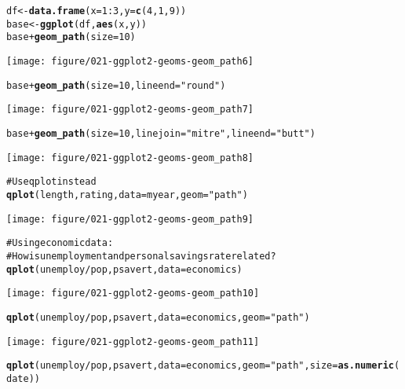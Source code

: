 \documentclass[a4paper,titlepage]{tufte-handout}\usepackage{graphicx, color}
\makeatletter
\def\maxwidth{ %
  \ifdim\Gin@nat@width>\linewidth
    \linewidth
  \else
    \Gin@nat@width
  \fi
}
\newcommand{\hlfunctioncall}[1]{\textcolor[rgb]{0.501960784313725,0,0.329411764705882}{\textbf{#1}}}%
\newcommand{\hlstring}[1]{\textcolor[rgb]{0.6,0.6,1}{#1}}%
\newcommand{\hlcomment}[1]{\textcolor[rgb]{0.180392156862745,0.6,0.341176470588235}{#1}}%
\newenvironment{kframe}{%
 \def\at@end@of@kframe{}%
 \ifinner\ifhmode%
  \def\at@end@of@kframe{\end{minipage}}%
  \begin{minipage}{\columnwidth}%
 \fi\fi%
 \def\FrameCommand##1{\hskip\@totalleftmargin \hskip-\fboxsep
 \colorbox{shadecolor}{##1}\hskip-\fboxsep
     \hskip-\linewidth \hskip-\@totalleftmargin \hskip\columnwidth}%
 \MakeFramed {\advance\hsize-\width
   \@totalleftmargin\z@ \linewidth\hsize
   \@setminipage}}%
 {\par\unskip\endMakeFramed%
 \at@end@of@kframe}
\newenvironment{knitrout}{}{} %
\makeatother
\begin{document}
\begin{knitrout}
\begin{kframe}
\begin{alltt}
df <- \hlfunctioncall{data.frame}(x = 1:3, y = \hlfunctioncall{c}(4, 1, 9))
base <- \hlfunctioncall{ggplot}(df, \hlfunctioncall{aes}(x, y))
base + \hlfunctioncall{geom_path}(size = 10)
\end{alltt}
\end{kframe}\texttt{[image: figure/021-ggplot2-geoms-geom\_path6]} \begin{kframe}\begin{alltt}
base + \hlfunctioncall{geom_path}(size = 10, lineend = \hlstring{"round"})
\end{alltt}
\end{kframe}\texttt{[image: figure/021-ggplot2-geoms-geom\_path7]} \begin{kframe}\begin{alltt}
base + \hlfunctioncall{geom_path}(size = 10, linejoin = \hlstring{"mitre"}, lineend = \hlstring{"butt"})
\end{alltt}
\end{kframe}\texttt{[image: figure/021-ggplot2-geoms-geom\_path8]} \begin{kframe}\begin{alltt}
\hlcomment{# Use qplot instead}
\hlfunctioncall{qplot}(length, rating, data=myear, geom=\hlstring{"path"})
\end{alltt}
\end{kframe}\texttt{[image: figure/021-ggplot2-geoms-geom\_path9]} \begin{kframe}\begin{alltt}
\hlcomment{# Using economic data:}
\hlcomment{# How is unemployment and personal savings rate related?}
\hlfunctioncall{qplot}(unemploy/pop, psavert, data=economics)
\end{alltt}
\end{kframe}\texttt{[image: figure/021-ggplot2-geoms-geom\_path10]} \begin{kframe}\begin{alltt}
\hlfunctioncall{qplot}(unemploy/pop, psavert, data=economics, geom=\hlstring{"path"})
\end{alltt}
\end{kframe}\texttt{[image: figure/021-ggplot2-geoms-geom\_path11]} \begin{kframe}\begin{alltt}
\hlfunctioncall{qplot}(unemploy/pop, psavert, data=economics, geom=\hlstring{"path"}, size=\hlfunctioncall{as.numeric}(date))
\end{alltt}

\end{kframe}
\end{knitrout}
\end{document}
